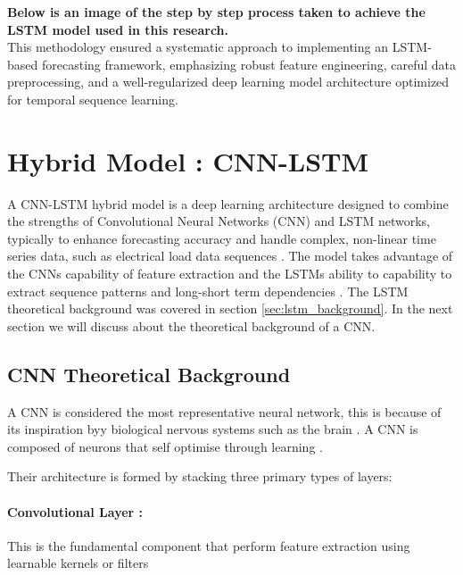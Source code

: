 \textbf{ 	Below is an image of the step by step process taken to achieve the LSTM model used in this research.}\\
This methodology ensured a systematic approach to implementing an LSTM-based forecasting framework, emphasizing robust feature engineering, careful data preprocessing, and a well-regularized deep learning model architecture optimized for temporal sequence learning.


\section{Hybrid Model : CNN-LSTM }
A CNN-LSTM hybrid model is a deep learning architecture designed to combine the strengths of Convolutional Neural Networks (CNN) and LSTM networks, typically to enhance forecasting accuracy and handle complex, non-linear time series data, such as electrical load data sequences \cite{zhu2025novel}. The model takes advantage of the CNNs capability of feature extraction and the LSTMs ability to capability to extract sequence patterns and long-short term dependencies \cite{alhussein2020hybrid}. The LSTM theoretical background was covered in section \ref{sec:lstm_background}. In the next section we will discuss about the theoretical background of a CNN.

\subsection{CNN Theoretical Background}

A CNN is considered the most representative neural network, this is because of its inspiration byy biological nervous systems such as the brain \cite{o2015introduction}. A CNN is composed of neurons that self optimise through learning \cite{o2015introduction}.

Their architecture is formed by stacking three primary types of layers:

\paragraph{Convolutional Layer : } This is the fundamental component that perform feature extraction using learnable kernels or filters \cite{bibid}